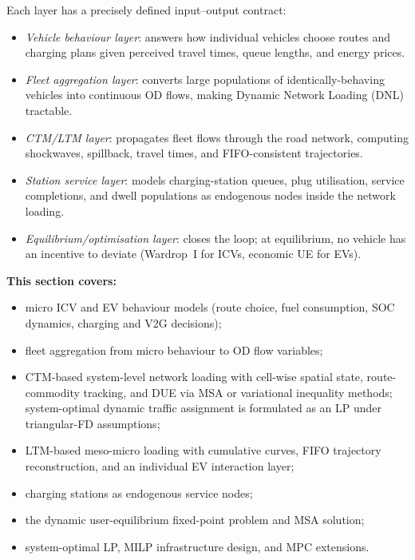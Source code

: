 \noindent
Each layer has a precisely defined input--output contract:
\begin{itemize}
  \item \emph{Vehicle behaviour layer}: answers how individual vehicles
        choose routes and charging plans given perceived travel times,
        queue lengths, and energy prices.
  \item \emph{Fleet aggregation layer}: converts large populations of
        identically-behaving vehicles into continuous OD flows, making
        Dynamic Network Loading (DNL) tractable.
  \item \emph{CTM/LTM layer}: propagates fleet flows through the road
        network, computing shockwaves, spillback, travel times, and
        FIFO-consistent trajectories.
  \item \emph{Station service layer}: models charging-station queues,
        plug utilisation, service completions, and dwell populations as
        endogenous nodes inside the network loading.
  \item \emph{Equilibrium/optimisation layer}: closes the loop;
        at equilibrium, no vehicle has an incentive to deviate
        (Wardrop~I for ICVs, economic UE for EVs).
\end{itemize}

\noindent\textbf{This section covers:}
\begin{itemize}
  \item micro ICV and EV behaviour models (route choice, fuel consumption,
        SOC dynamics, charging and V2G decisions);
  \item fleet aggregation from micro behaviour to OD flow variables;
  \item CTM-based system-level network loading with cell-wise spatial
        state, route-commodity tracking, and DUE via MSA or variational
        inequality methods; system-optimal dynamic traffic assignment is
        formulated as an LP under triangular-FD assumptions;
  \item LTM-based meso-micro loading with cumulative curves, FIFO
        trajectory reconstruction, and an individual EV interaction layer;
  \item charging stations as endogenous service nodes;
  \item the dynamic user-equilibrium fixed-point problem and MSA solution;
  \item system-optimal LP, MILP infrastructure design, and MPC extensions.
\end{itemize}

